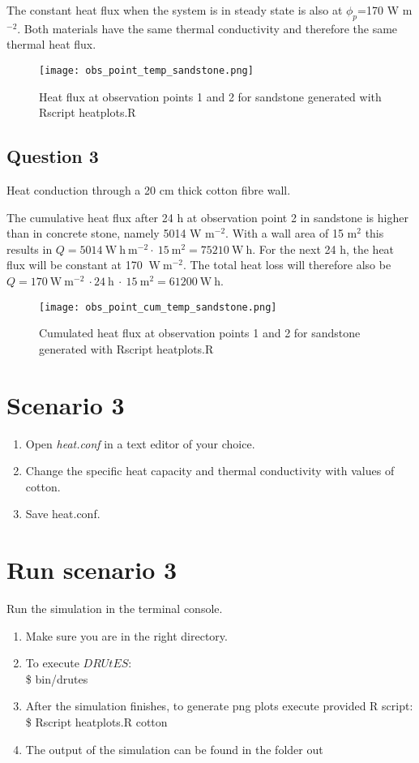 \documentclass[
10pt, %
a4paper, %
oneside, %
headinclude,footinclude, %
BCOR5mm, %
]{scrartcl}
\begin{document}
The constant heat flux when the system is in steady state is also at $\phi_{p}$=170 W m$^{-2}$. Both materials have the same thermal conductivity and therefore the same thermal heat flux.

\begin{figure}[!h]
\centering
\texttt{[image: obs\_point\_temp\_sandstone.png]}
\caption{\label{plot5} Heat flux at observation points 1 and 2 for sandstone generated with Rscript heatplots.R}
\end{figure}


\subsection*{Question 3}
Heat conduction through a 20 cm thick cotton fibre wall. 

The cumulative heat flux after 24 h at observation point 2 in sandstone is higher than in concrete stone, namely 5014 W m$^{-2}$. With a wall area of 15 m$^2$ this results in $Q = 5014~\mathrm{W~h~m^{-2}}\cdot~15~\mathrm{m^{2}}= 75210 ~\mathrm{W~h}$. 
For the next 24 h, the heat flux will be constant at 170 $\mathrm{~W~m^{-2}}$. The total heat loss will therefore also be $Q=170 \mathrm{~W~m^{-2}}~\cdot 24~\mathrm{h}~\cdot~15~\mathrm{m^{2}}=61200 \mathrm{~W~h}$.

\begin{figure}[!h]
\centering
\texttt{[image: obs\_point\_cum\_temp\_sandstone.png]}
\caption{\label{plot6} Cumulated heat flux at observation points 1 and 2 for sandstone generated with Rscript heatplots.R}
\end{figure}

\newpage
\newpage
\newpage
\clearpage
\section*{Scenario 3}

\begin{enumerate}
\item Open \emph{heat.conf} in a text editor of your choice. 
\item Change the specific heat capacity and thermal conductivity with values of cotton.
\item Save heat.conf.
\end{enumerate}

\section*{Run scenario 3}
Run the simulation in the terminal console.
\begin{enumerate}
\item Make sure you are in the right directory. 
\item To execute $DRUtES$: \\
\$ bin/drutes
\item After the simulation finishes, to generate png plots execute provided R script: \\
\$ Rscript heatplots.R cotton
\item The output of the simulation can be found in the folder out
\end{enumerate}
\end{document}
